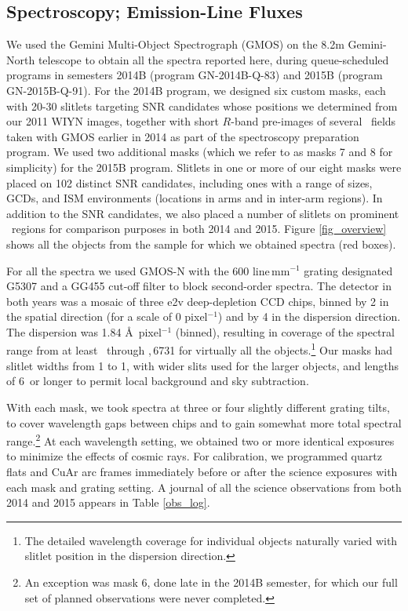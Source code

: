 \subsection{Spectroscopy; Emission-Line Fluxes}


We used the Gemini Multi-Object Spectrograph (GMOS) on the 8.2m Gemini-North telescope to obtain all the spectra reported here, during queue-scheduled programs in semesters 2014B (program GN-2014B-Q-83) and 2015B (program GN-2015B-Q-91).  
For the 2014B program, we designed six custom masks, each with 20-30 slitlets targeting SNR candidates whose positions we determined from our 2011 WIYN images, together with  short $R$-band pre-images of several \gal\ fields taken with GMOS earlier in 2014 as part of the spectroscopy preparation program.    
We used two additional masks (which we refer to as masks 7 and 8 for simplicity)  for the 2015B program.  Slitlets in one or more of our eight masks were placed on 102 distinct SNR candidates, including ones with a range of sizes, GCDs, and ISM environments (locations in arms and in 
inter-arm regions).  In addition to the SNR candidates, we also placed a number of slitlets on prominent \hii\ regions for comparison purposes in both 2014 and 2015.
Figure \ref{fig_overview} shows all the objects from the sample for which we obtained spectra (red boxes). 

For all the spectra we used GMOS-N with the 600 line\,mm$^{-1}$ grating designated G5307 and a GG455 cut-off filter to block second-order spectra.   The detector in both years was a mosaic of three e2v deep-depletion CCD chips, binned by 2 in the spatial direction (for a scale of 0 pixel$^{-1}$) and by 4 in the dispersion direction.  
The dispersion was 1.84 \AA\,  pixel$^{-1}$ (binned), resulting in coverage of the spectral range from at least \hb\ through \sii{},\,6731 for virtually all the objects.\footnote{The detailed wavelength coverage for individual objects naturally varied with slitlet position in the dispersion direction.}  Our  masks had  slitlet  widths from 1 to 1, with wider slits used for the larger objects, and lengths of 6\arcsec\ or longer to permit local background and sky subtraction.   

With each mask, we took spectra at three or four slightly different grating tilts, to cover wavelength gaps between chips and to gain somewhat more total spectral range.\footnote{An exception was mask 6, done late in the 2014B semester, for which our full set of planned observations were never completed.}  At each wavelength setting, we obtained two or more identical exposures to minimize the effects of cosmic rays.
For calibration, we programmed quartz flats and CuAr arc frames immediately before or after the science exposures with each mask and grating setting.  A journal of all the science observations from both 2014 and 2015 appears in Table \ref{obs_log}.  

